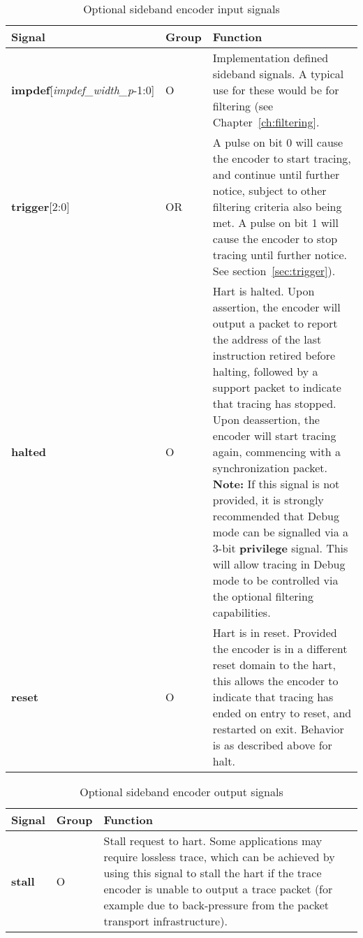 \begin{table}[htp]
    \centering
    \caption{Optional sideband encoder input signals}
    \label{tab:ingress-side-band}
    \begin{tabulary}{\textwidth}{|l|l|p{90mm}|}
        \hline
        \textbf{Signal} & \textbf{Group} & \textbf{Function} \\
        \hline
        \textbf{impdef}[\textit{impdef\_width\_p}-1:0] & O &  Implementation defined sideband signals.  A typical use for
        these would be for filtering (see Chapter~\ref{ch:filtering}.\\
        \hline
        \textbf{trigger}[2:0] & OR & A pulse on bit 0 will cause the encoder to start tracing, and continue until further 
        notice, subject to other filtering criteria also being met.\newline
        A pulse on bit 1 will cause the encoder to stop tracing until further notice.  See section~\ref{sec:trigger}).\\
        \hline
        \textbf{halted} & O & Hart is halted.  Upon assertion, the encoder will output a packet to report the address 
        of the last instruction retired before halting, followed by a support packet to indicate that tracing has stopped. 
        Upon deassertion, the encoder will start tracing again, commencing with a synchronization packet.
        \textbf{Note:} If this signal is not provided, it is strongly recommended that Debug mode can be signalled via a 3-bit 
          \textbf{privilege} signal.  This will allow tracing in Debug mode to be controlled via the optional filtering capabilities.\\
        \hline
        \textbf{reset} & O & Hart is in reset.  Provided the encoder is in a different reset domain to the hart, this
        allows the encoder to indicate that tracing has ended on entry to reset, and restarted on exit.  
        Behavior is as described above for halt.\\
        \hline
    \end{tabulary}
\end{table}

\begin{table}[htp]
    \centering
    \caption{Optional sideband encoder output signals}
    \label{tab:egress-side-band}
    \begin{tabulary}{\textwidth}{|l|l|p{125mm}|}
        \hline
        \textbf{Signal} & \textbf{Group} & \textbf{Function} \\
        \hline
        \textbf{stall} & O & Stall request to hart.  Some applications may require lossless trace, which can be achieved by
        using this signal to stall the hart if the trace encoder is unable to output a trace packet (for example due to 
        back-pressure from the packet transport infrastructure).\\
        \hline
    \end{tabulary}
\end{table}

